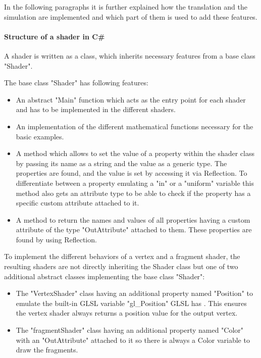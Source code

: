 In the following paragraphs it is further explained how the translation and the simulation are implemented and which part of them is used to add these features.

\paragraph{Structure of a shader in C\#}

A shader is written as a class, which inherits necessary features from a base class "Shader".

The base class "Shader" has following features:
\begin{itemize}
\item An abstract "Main" function which acts as the entry point for each shader and has to be implemented in the different shaders.
\item An implementation of the different mathematical functions necessary for the basic examples.
\item A method which allows to set the value of a property within the shader class by passing its name as a string and the value as a generic type. The properties are found, and the value is set by accessing it via Reflection. To differentiate between a property emulating a "in" or a "uniform" variable this  method also gets an attribute type to be able to check if the property has a specific custom attribute attached to it.
\item A method to return the names and values of all properties having a custom attribute of the type "OutAttribute" attached to them. These properties are found by using Reflection.
\end{itemize}

To implement the different behaviors of a vertex and a fragment shader, the resulting shaders are not directly inheriting the Shader class but one of two additional abstract classes implementing the base class "Shader":
\begin{itemize}
\item The "VertexShader" class having an additional property named "Position" to emulate the built-in GLSL variable "gl\_Position" GLSL has . This ensures the vertex shader always returns a position value for the output vertex.
\item The "fragmentShader" class having an additional property named "Color" with an "OutAttribute" attached to it so there is always a Color variable to draw the fragments.
\end{itemize}


